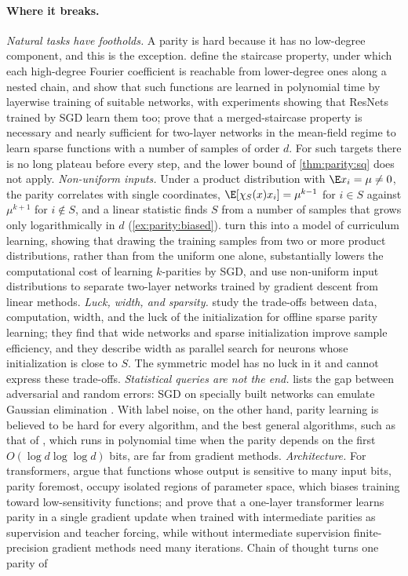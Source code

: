 \begin{refsection}
\paragraph{Where it breaks.}
\emph{Natural tasks have footholds.} A parity is hard because it has no low-degree component, and this is the exception. \Textcite{AbbeEtAl2021} define the staircase property, under which each high-degree Fourier coefficient is reachable from lower-degree ones along a nested chain, and show that such functions are learned in polynomial time by layerwise training of suitable networks, with experiments showing that ResNets trained by SGD learn them too; \textcite{AbbeBoixAdseraMisiakiewicz2022} prove that a merged-staircase property is necessary and nearly sufficient for two-layer networks in the mean-field regime to learn sparse functions with a number of samples of order $d$. For such targets there is no long plateau before every step, and the lower bound of \cref{thm:parity:sq} does not apply. \emph{Non-uniform inputs.} Under a product distribution with $\E x_i=\mu\ne0$, the parity correlates with single coordinates, $\E[\chi_S(x)x_i]=\mu^{k-1}$ for $i\in S$ against $\mu^{k+1}$ for $i\notin S$, and a linear statistic finds $S$ from a number of samples that grows only logarithmically in $d$ (\cref{ex:parity:biased}). \Textcite{CornacchiaMossel2023} turn this into a model of curriculum learning, showing that drawing the training samples from two or more product distributions, rather than from the uniform one alone, substantially lowers the computational cost of learning $k$-parities by SGD, and \textcite{DanielyMalach2020} use non-uniform input distributions to separate two-layer networks trained by gradient descent from linear methods. \emph{Luck, width, and sparsity.} \Textcite{EdelmanEtAl2023} study the trade-offs between data, computation, width, and the luck of the initialization for offline sparse parity learning; they find that wide networks and sparse initialization improve sample efficiency, and they describe width as parallel search for neurons whose initialization is close to $S$. The symmetric model has no luck in it and cannot express these trade-offs. \emph{Statistical queries are not the end.}  lists the gap between adversarial and random errors: SGD on specially built networks can emulate Gaussian elimination \parencite{AbbeSandon2020}. With label noise, on the other hand, parity learning is believed to be hard for every algorithm, and the best general algorithms, such as that of \textcite{BlumKalaiWasserman2003}, which runs in polynomial time when the parity depends on the first $O(\log d\log\log d)$ bits, are far from gradient methods. \emph{Architecture.} For transformers, \textcite{HahnRofin2024} argue that functions whose output is sensitive to many input bits, parity foremost, occupy isolated regions of parameter space, which biases training toward low-sensitivity functions; and \textcite{KimSuzuki2025} prove that a one-layer transformer learns parity in a single gradient update when trained with intermediate parities as supervision and teacher forcing, while without intermediate supervision finite-precision gradient methods need many iterations. Chain of thought turns one parity of 
\end{refsection}
